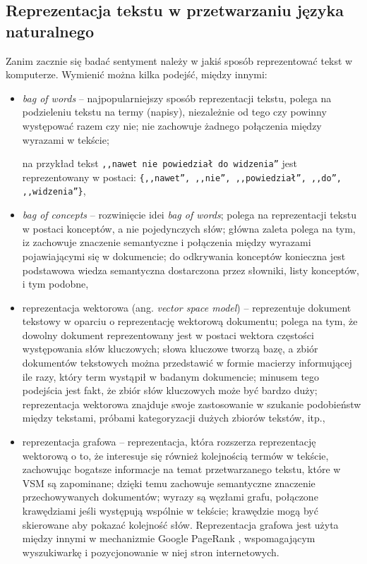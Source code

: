 \subsection{Reprezentacja tekstu w przetwarzaniu języka naturalnego}
Zanim zacznie się badać sentyment należy w jakiś sposób reprezentować tekst w
komputerze. Wymienić można kilka podejść, między innymi:
\begin{itemize}
  \item \textit{bag of words} \cite{BOWordsAndBOConcepts} -- najpopularniejszy
  sposób reprezentacji tekstu, polega na podzieleniu tekstu na termy (napisy),
  niezależnie od tego czy powinny występować razem czy nie; nie zachowuje
  żadnego połączenia między wyrazami w tekście; 
  
  na przykład tekst 
  \texttt{,,nawet nie powiedział do widzenia''} jest reprezentowany w postaci:
  \texttt{\{,,nawet'', ,,nie'', ,,powiedział'', ,,do'', ,,widzenia''\}},
  
  
  \item \textit{bag of concepts} \cite{BOWordsAndBOConcepts} -- rozwinięcie idei
  \textit{bag of words}; polega na reprezentacji tekstu w postaci konceptów,
  a nie pojedynczych słów; główna zaleta polega na tym, iz zachowuje znaczenie
  semantyczne i połączenia między wyrazami pojawiającymi się w dokumencie; do
  odkrywania konceptów konieczna jest podstawowa wiedza semantyczna dostarczona
  przez słowniki, listy konceptów, i tym podobne,
  
  \item reprezentacja wektorowa (ang. \textit{vector space model})
  \cite{VectorSpaceModel} -- reprezentuje dokument tekstowy w
  oparciu o reprezentację wektorową dokumentu; polega na tym, że dowolny
  dokument reprezentowany jest w postaci wektora częstości występowania słów
  kluczowych; słowa kluczowe tworzą bazę, a zbiór dokumentów tekstowych
  można przedstawić w formie macierzy informującej ile razy, który term wystąpił
  w badanym dokumencie; minusem tego podejścia jest fakt, że zbiór słów
  kluczowych może być bardzo duży; reprezentacja wektorowa znajduje swoje
  zastosowanie w szukanie podobieństw między tekstami, próbami kategoryzacji
  dużych zbiorów tekstów, itp.,
  
  \item reprezentacja grafowa \cite{GraphBasedTextModel} -- reprezentacja,
  która rozszerza reprezentację wektorową o to, że interesuje się również
  kolejnością termów w tekście, zachowując bogatsze informacje na temat
  przetwarzanego tekstu, które w VSM są zapominane; dzięki temu zachowuje
  semantyczne znaczenie przechowywanych dokumentów; wyrazy są węzłami grafu,
  połączone krawędziami jeśli występują wspólnie w tekście; krawędzie mogą być
  skierowane aby pokazać kolejność słów. Reprezentacja grafowa jest użyta między
  innymi w mechanizmie Google PageRank \cite{TextNetworkModel}, wspomagającym
  wyszukiwarkę i pozycjonowanie w niej stron internetowych.  
\end{itemize}


